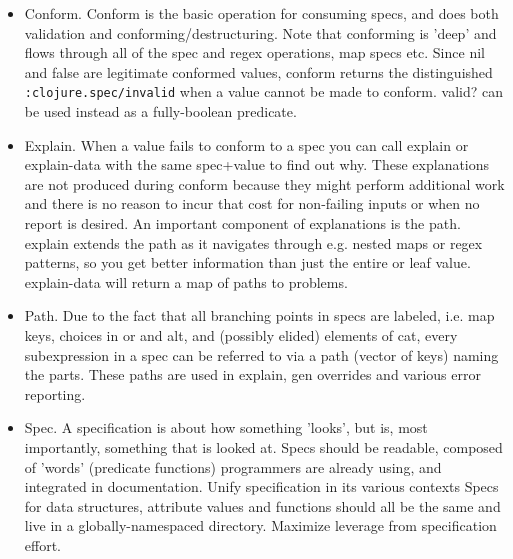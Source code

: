 
\begin{itemize}
\item Conform. Conform is the basic operation for consuming specs, and does both
  validation and conforming/destructuring. Note that conforming is 'deep' and
  flows through all of the spec and regex operations, map specs etc. Since nil
  and false are legitimate conformed values, conform returns the distinguished
  \texttt{:clojure.spec/invalid} when a value cannot be made to conform. valid?
  can be used instead as a fully-boolean predicate.

\item Explain. When a value fails to conform to a spec you can call explain or
  explain-data with the same spec+value to find out why. These explanations are
  not produced during conform because they might perform additional work and
  there is no reason to incur that cost for non-failing inputs or when no report
  is desired. An important component of explanations is the path. explain
  extends the path as it navigates through e.g. nested maps or regex patterns,
  so you get better information than just the entire or leaf value. explain-data
  will return a map of paths to problems.

\item Path. Due to the fact that all branching points in specs are labeled, i.e.
  map keys, choices in or and alt, and (possibly elided) elements of cat, every
  subexpression in a spec can be referred to via a path (vector of keys) naming
  the parts. These paths are used in explain, gen overrides and various error
  reporting.

\item Spec. A specification is about how something 'looks', but is, most
  importantly, something that is looked at. Specs should be readable, composed
  of 'words' (predicate functions) programmers are already using, and integrated
  in documentation. Unify specification in its various contexts Specs for data
  structures, attribute values and functions should all be the same and live in
  a globally-namespaced directory. Maximize leverage from specification effort.

\end{itemize}

